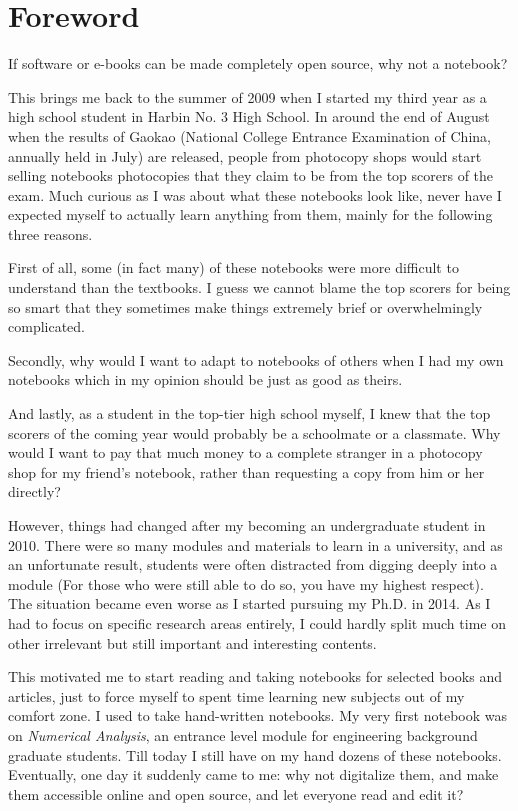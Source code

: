 \chapter*{Foreword}
If software or e-books can be made completely open source, why not a notebook?

This brings me back to the summer of 2009 when I started my third year as a high school student in Harbin No. 3 High School. In around the end of August when the results of Gaokao (National College Entrance Examination of China, annually held in July) are released, people from photocopy shops would start selling notebooks photocopies that they claim to be from the top scorers of the exam. Much curious as I was about what these notebooks look like, never have I expected myself to actually learn anything from them, mainly for the following three reasons.

First of all, some (in fact many) of these notebooks were more difficult to understand than the textbooks. I guess we cannot blame the top scorers for being so smart that they sometimes make things extremely brief or overwhelmingly complicated.

Secondly, why would I want to adapt to notebooks of others when I had my own notebooks which in my opinion should be just as good as theirs.

And lastly, as a student in the top-tier high school myself, I knew that the top scorers of the coming year would probably be a schoolmate or a classmate. Why would I want to pay that much money to a complete stranger in a photocopy shop for my friend's notebook, rather than requesting a copy from him or her directly?

However, things had changed after my becoming an undergraduate student in 2010. There were so many modules and materials to learn in a university, and as an unfortunate result, students were often distracted from digging deeply into a module (For those who were still able to do so, you have my highest respect). The situation became even worse as I started pursuing my Ph.D. in 2014. As I had to focus on specific research areas entirely, I could hardly split much time on other irrelevant but still important and interesting contents.

This motivated me to start reading and taking notebooks for selected books and articles, just to force myself to spent time learning new subjects out of my comfort zone. I used to take hand-written notebooks. My very first notebook was on \textit{Numerical Analysis}, an entrance level module for engineering background graduate students. Till today I still have on my hand dozens of these notebooks. Eventually, one day it suddenly came to me: why not digitalize them, and make them accessible online and open source, and let everyone read and edit it?

